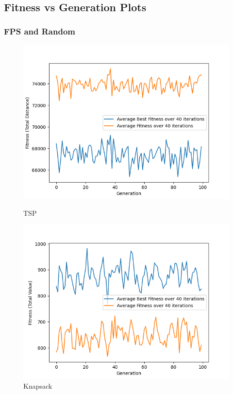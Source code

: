 \documentclass[11pt, letterpaper]{article}
\begin{document}
\subsection{Fitness vs Generation Plots}
\subsubsection {FPS and Random}
\begin{figure}[!h]
  \includegraphics[width=\linewidth]{images/tsp_fp_rd.png}
  \caption{TSP}
\endminipage\hfill
{}
  \includegraphics[width=\linewidth]{images/knapsack_fp_rd.png}
  \caption{Knapsack}
\endminipage\hfill
{}%

\end{figure}
\end{document}
